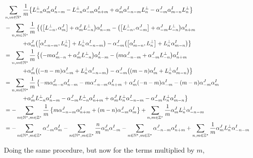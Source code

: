 \begin{align*}
    &\sum\limits_{n,m\in\mathbb N^\ast}\frac{1}{m}\qty{L^\perp_{-n}\alpha^J_m\alpha^I_{n-m}-L^\perp_{-n}\alpha^J_{-m}\alpha^I_{n+m}+\alpha^J_m\alpha^I_{-n-m}L^\perp_n-\alpha^J_{-m}\alpha^I_{m-n}L^\perp_n}\\
    &=\sum\limits_{n,m\in\mathbb N^\ast}\frac{1}{m}\left\{\qty(\comm{L^\perp_{-n}}{\alpha^J_m}+\alpha^J_mL^\perp_{-n})\alpha^I_{n-m}-\qty(\comm{L^\perp_{-n}}{\alpha^J_{-m}}+\alpha^J_{-m}L^\perp_{-n})\alpha^I_{n+m}\right.\\
    &\quad\quad\quad\left.+\alpha^J_m\qty(\comm{\alpha^I_{-n-m}}{L^\perp_n}+L^\perp_n\alpha^I_{-n-m})-\alpha^J_{-m}\qty(\comm{\alpha^I_{m-n}}{L^\perp_n}+L^\perp_n\alpha^I_{m-n})\right\}\\
    &=\sum\limits_{n,m\in\mathbb N^\ast}\frac{1}{m}\left\{\qty(-m\alpha^J_{m-n}+\alpha^J_{m}L^\perp_{-n})\alpha^I_{n-m}-\qty(m\alpha^J_{-n-m}+\alpha^J_{-m}L^\perp_{-n})\alpha^I_{n+m}\right.\\
    &\quad\quad\quad\left.+\alpha^J_{m}\qty(\qty(-n-m)\alpha^I_{-m}+L^\perp_n\alpha^I_{-n-m})-\alpha^J_{-m}\qty(\qty(m-n)\alpha^I_m+L^\perp_n\alpha^I_{m-n})\right\}\\
    &=\sum\limits_{n,m\in\mathbb N^\ast}\frac{1}{m}\left\{-m\alpha^J_{m-n}\alpha^I_{n-m}-m\alpha^J_{-n-m}\alpha^I_{n+m}+\alpha^J_{m}\qty(-n-m)\alpha^I_{-m}-\qty(m-n)\alpha^J_{-m}\alpha^I_m\right.\\
    &\quad\quad\quad\left.+\alpha^J_{m}L^\perp_{-n}\alpha^I_{n-m}-\alpha^J_{-m}L^\perp_{-n}\alpha^I_{n+m}+\alpha^J_{m}L^\perp_n\alpha^I_{-n-m}-\alpha^J_{-m}L^\perp_n\alpha^I_{m-n}\right\}\\
    &=-\sum\limits_{n\in\mathbb N^\ast,m\in\mathbb Z^\ast}\frac{1}{m}\left\{m\alpha^J_{-n-m}\alpha^I_{n+m}+\qty(m-n)\alpha^J_{-m}\alpha^I_m\right\}+\sum\limits_{n,m\in\mathbb Z^\ast}\frac1m\alpha^J_{m}L^\perp_n\alpha^I_{-n-m}\\
    &=-\sum\limits_{n\in\mathbb N^\ast,m\in\mathbb Z^\ast}\alpha^J_{-m}\alpha^I_m-\sum\limits_{n\in\mathbb N^\ast,m\in\mathbb Z^\ast}\frac{n}{m}\alpha^J_{m}\alpha^I_{-m}-\sum\limits_{n\in\mathbb N^\ast,m\in\mathbb Z^\ast}\alpha^J_{-n-m}\alpha^I_{n+m}+\sum\limits_{n,m\in\mathbb Z^\ast}\frac1m\alpha^J_{m}L^\perp_n\alpha^I_{-n-m}
\end{align*}

Doing the same procedure, but now for the terms multiplied by $m$,

